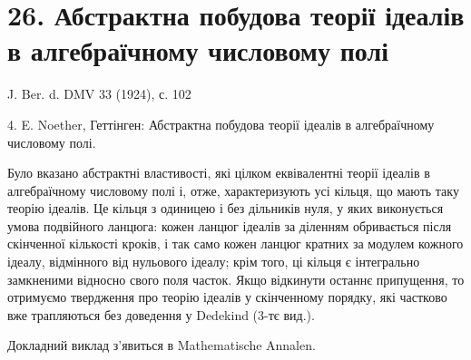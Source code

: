 \documentclass[11pt]{article}
\begin{document}
\section*{26. Абстрактна побудова теорії ідеалів в алгебраїчному числовому полі}

\begin{center}
J. Ber. d. DMV 33 (1924), с. 102
\end{center}

4. E. Noether, Геттінген: Абстрактна побудова теорії ідеалів в алгебраїчному числовому полі.

Було вказано абстрактні властивості, які цілком еквівалентні теорії ідеалів в алгебраїчному числовому полі і, отже, характеризують усі кільця, що мають таку теорію ідеалів. Це кільця з одиницею і без дільників нуля, у яких виконується умова подвійного ланцюга: кожен ланцюг ідеалів за діленням обривається після скінченної кількості кроків, і так само кожен ланцюг кратних за модулем кожного ідеалу, відмінного від нульового ідеалу; крім того, ці кільця є інтегрально замкненими відносно свого поля часток. Якщо відкинути останнє припущення, то отримуємо твердження про теорію ідеалів у скінченному порядку, які частково вже трапляються без доведення у Dedekind (3-тє вид.).

Докладний виклад з'явиться в Mathematische Annalen.
\end{document}
